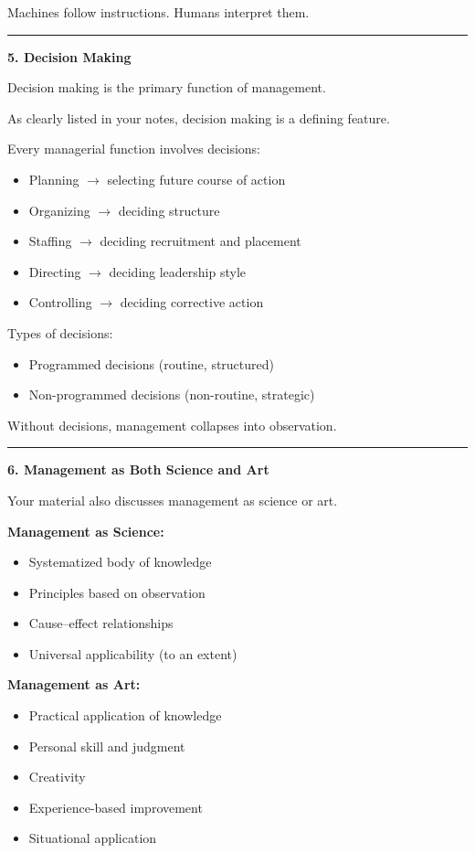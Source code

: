 \documentclass[10pt,a4paper]{article}
\newcommand{\separator}{\vspace{0.4em}\noindent\rule{\linewidth}{0.6pt}\vspace{0.4em}}
\begin{document}
Machines follow instructions. Humans interpret them.

\separator

\textbf{5. Decision Making}

Decision making is the primary function of management.

As clearly listed in your notes, decision making is a defining feature.

Every managerial function involves decisions:

\begin{itemize}
  \item Planning $\rightarrow$ selecting future course of action
  \item Organizing $\rightarrow$ deciding structure
  \item Staffing $\rightarrow$ deciding recruitment and placement
  \item Directing $\rightarrow$ deciding leadership style
  \item Controlling $\rightarrow$ deciding corrective action
\end{itemize}

Types of decisions:

\begin{itemize}
  \item Programmed decisions (routine, structured)
  \item Non-programmed decisions (non-routine, strategic)
\end{itemize}

Without decisions, management collapses into observation.

\separator

\textbf{6. Management as Both Science and Art}

Your material also discusses management as science or art.

\textbf{Management as Science:}

\begin{itemize}
  \item Systematized body of knowledge
  \item Principles based on observation
  \item Cause--effect relationships
  \item Universal applicability (to an extent)
\end{itemize}

\textbf{Management as Art:}

\begin{itemize}
  \item Practical application of knowledge
  \item Personal skill and judgment
  \item Creativity
  \item Experience-based improvement
  \item Situational application
\end{itemize}
\end{document}
